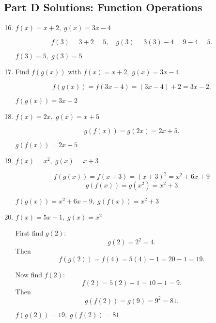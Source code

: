 \documentclass[12pt]{article}
\begin{document}
\subsection*{Part D Solutions: Function Operations}
\begin{enumerate}
  \setcounter{enumi}{15}
  \item \(f(x) = x + 2,\; g(x) = 3x - 4\)

  \[
  f(3)=3+2=5,\quad g(3)=3(3)-4=9-4=5.
  \]

  \(\boxed{f(3)=5,\; g(3)=5}\)

  \item Find \(f(g(x))\) with \(f(x)=x+2,\; g(x)=3x-4\)

  \[
  f(g(x)) = f(3x - 4) = (3x - 4) + 2 = 3x - 2.
  \]

  \(\boxed{f(g(x)) = 3x - 2}\)

  \item \(f(x) = 2x,\; g(x) = x + 5\)

  \[
  g(f(x)) = g(2x) = 2x + 5.
  \]

  \(\boxed{g(f(x)) = 2x + 5}\)

  \item \(f(x) = x^2,\; g(x) = x + 3\)

  \[
  f(g(x)) = f(x + 3) = (x + 3)^2 = x^2 + 6x + 9
  \]
  \[
  g(f(x)) = g(x^2) = x^2 + 3
  \]

  \(\boxed{f(g(x)) = x^2 + 6x + 9,\; g(f(x)) = x^2 + 3}\)

  \item \(f(x) = 5x - 1,\; g(x) = x^2\)

  First find \(g(2)\):
  \[
  g(2) = 2^2 = 4.
  \]
  Then
  \[
  f(g(2)) = f(4) = 5(4) - 1 = 20 - 1 = 19.
  \]

  Now find \(f(2)\):
  \[
  f(2) = 5(2) - 1 = 10 - 1 = 9.
  \]
  Then
  \[
  g(f(2)) = g(9) = 9^2 = 81.
  \]

  \(\boxed{f(g(2)) = 19,\; g(f(2)) = 81}\)
\end{enumerate}
\end{document}
